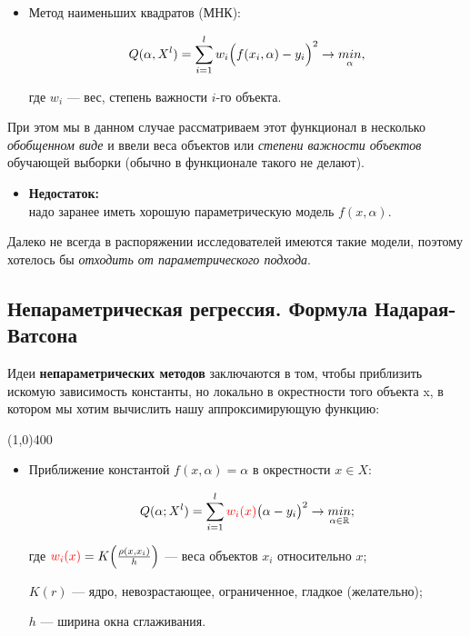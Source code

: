 \documentclass{article}
\begin{document}
\begin{itemize}
\item Метод наименьших квадратов (МНК):

$$Q(\alpha, X^l) = \sum\limits_{i = 1}^l w_i \Bigl(f(x_i, \alpha) - y_i\Bigr)^2
\rightarrow \underset{\alpha}{min},$$

где $w_i$ --- вес, степень важности $i$-го объекта.
\end{itemize}
 
При этом мы в данном случае рассматриваем этот функционал в несколько \textit{обобщенном виде} и ввели веса объектов или \textit{степени важности объектов} обучающей выборки (обычно в функционале такого не делают). 
\\

\begin{itemize}
\item[] \textbf{Недостаток:}\\
надо заранее иметь хорошую параметрическую модель $f(x, \alpha)$.
\end{itemize}

Далеко не всегда в распоряжении исследователей имеются такие модели, поэтому хотелось бы \textit{отходить от параметрического подхода}.

\newpage
\subsection{Непараметрическая регрессия. Формула Надарая-Ватсона}

Идеи \textbf{непараметрических методов} заключаются в том, чтобы приблизить искомую зависимость константы, но локально в окрестности того объекта x, в котором мы хотим вычислить нашу аппроксимирующую функцию:

\begin{center}
\line(1,0){400}
\end{center}

\begin{itemize}
\item[] Приближение константой $f(x, \alpha) = \alpha$ в окрестности $x \in X$:

$$Q(\alpha; X^l) = \sum\limits_{i = 1}^l
\textcolor{red}{w_i(x)}\bigl(\alpha - y_i\bigr)^2
\rightarrow \underset{\alpha \in \mathbb{R}}{min};$$

где $\textcolor{red}{w_i(x)} = K \Bigl(\frac{\rho(x, x_i)}{h}\Bigr)$ --- веса объектов $x_i$ относительно $x$;

$K(r)$ --- ядро, невозрастающее, ограниченное, гладкое (желательно);

$h$ --- ширина окна сглаживания.
\end{itemize}
\end{document}
